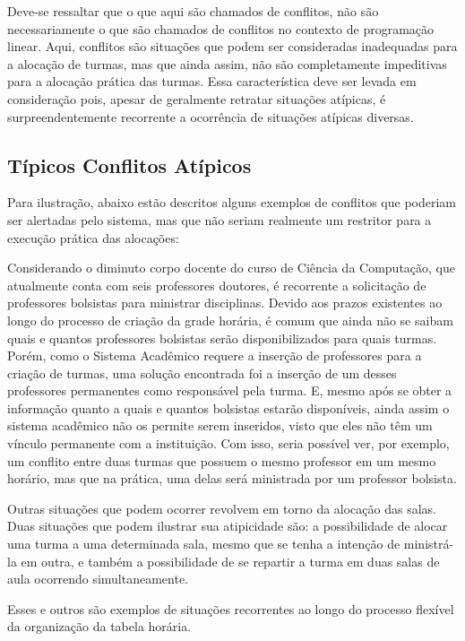 Deve-se ressaltar que o que aqui são chamados de conflitos, não são necessariamente o que são chamados de conflitos no contexto de programação linear. Aqui, conflitos são situações que podem ser consideradas inadequadas para a alocação de turmas, mas que ainda assim, não são completamente impeditivas para a alocação prática das turmas. Essa característica deve ser levada em consideração pois, apesar de geralmente retratar situações atípicas, é surpreendentemente recorrente a ocorrência de situações atípicas diversas.

\subsection{Típicos Conflitos Atípicos}

Para ilustração, abaixo estão descritos alguns exemplos de conflitos que poderiam ser alertadas pelo sistema, mas que não seriam realmente um restritor para a execução prática das alocações:

Considerando o diminuto corpo docente do curso de Ciência da Computação, que atualmente conta com seis professores doutores, é recorrente a solicitação de professores bolsistas para ministrar disciplinas. Devido aos prazos existentes ao longo do processo de criação da grade horária, é comum que ainda não se saibam quais e quantos professores bolsistas serão disponibilizados para quais turmas. Porém, como o Sistema Acadêmico requere a inserção de professores para a criação de turmas, uma solução encontrada foi a inserção de um desses professores permanentes como responsável pela turma. E, mesmo após se obter a informação quanto a quais e quantos bolsistas estarão disponíveis, ainda assim o sistema acadêmico não os permite serem inseridos, visto que eles não têm um vínculo permanente com a instituição. Com isso, seria possível ver, por exemplo, um conflito entre duas turmas que possuem o mesmo professor em um mesmo horário, mas que na prática, uma delas será ministrada por um professor bolsista.

Outras situações que podem ocorrer revolvem em torno da alocação das salas. Duas situações que podem ilustrar sua atipicidade são: a possibilidade de alocar uma turma a uma determinada sala, mesmo que se tenha a intenção de ministrá-la em outra, e também a possibilidade de se repartir a turma em duas salas de aula ocorrendo simultaneamente.

Esses e outros são exemplos de situações recorrentes ao longo do processo flexível da organização da tabela horária.

